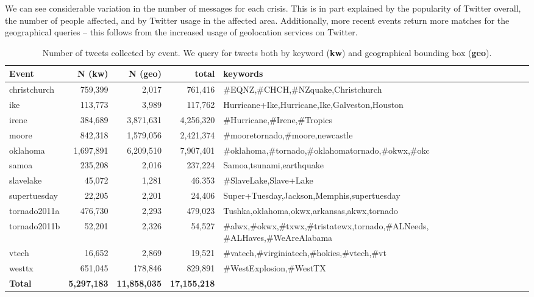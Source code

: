 \documentclass{article}
\begin{document}
We can see considerable variation in the number of messages for each
crisis. This is in part explained by the popularity of Twitter overall, the
number of people affected, and by Twitter usage in the affected
area. Additionally, more recent events return more matches for the
geographical queries -- this follows from the increased usage of geolocation
services on Twitter.

\begin{table}
\centering
\small
\begin{tabular}{|l|r|r|r| p{8cm} |}
\hline
{\bf Event}  & {\bf N (kw)} & {\bf N (geo)} & {\bf total} & {\bf keywords} \\
\hline
christchurch &  759,399  & 2,017       &  761,416    & \#EQNZ,\#CHCH,\#NZquake,Christchurch\\
ike          &  113,773  & 3,989       &  117,762    & Hurricane+Ike,Hurricane,Ike,Galveston,Houston\\
irene        &  384,689  & 3,871,631   &  4,256,320  & \#Hurricane,\#Irene,\#Tropics\\
moore        &  842,318  & 1,579,056   &  2,421,374  & \#mooretornado,\#moore,newcastle\\
oklahoma     & 1,697,891 & 6,209,510   &  7,907,401  & \#oklahoma,\#tornado,\#oklahomatornado,\#okwx,\#okc\\
samoa        & 235,208   &  2,016      &  237,224    &  Samoa,tsunami,earthquake\\
slavelake    & 45,072    &  1,281      &  46.353     & \#SlaveLake,Slave+Lake\\
supertuesday & 22,205    &  2,201      &  24,406     & Super+Tuesday,Jackson,Memphis,supertuesday\\
tornado2011a & 476,730   &  2,293      &  479,023    & Tushka,oklahoma,okwx,arkansas,akwx,tornado\\
tornado2011b & 52,201    &  2,326      &  54,527     & \#alwx,\#okwx,\#txwx,\#tristatewx,tornado,\mbox{\#ALNeeds}, \#ALHaves,\#WeAreAlabama\\
vtech        & 16,652    &  2,869      &  19,521     & \#vatech,\#virginiatech,\#hokies,\#vtech,\#vt\\
westtx       & 651,045   &  178,846    &  829,891    & \#WestExplosion,\#WestTX\\
\hline
{\bf Total}  & {\bf 5,297,183} & {\bf 11,858,035}  & {\bf 17,155,218}  &\\
\hline
\end{tabular}
\caption{Number of tweets collected by event. We query for tweets both by
  keyword ({\bf kw}) and geographical bounding box ({\bf geo}). \label{tab.data_summary}}
\end{table}
\end{document}
